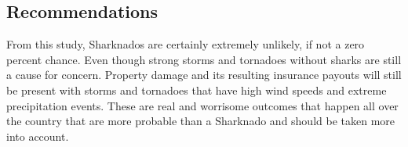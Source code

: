 \documentclass[
  letterpaper,
  DIV=11,
  numbers=noendperiod]{scrreprt}
\begin{document}
\subsection{Recommendations}\label{recommendations-1}

From this study, Sharknados are certainly extremely unlikely, if not a
zero percent chance. Even though strong storms and tornadoes without
sharks are still a cause for concern. Property damage and its resulting
insurance payouts will still be present with storms and tornadoes that
have high wind speeds and extreme precipitation events. These are real
and worrisome outcomes that happen all over the country that are more
probable than a Sharknado and should be taken more into account.
\end{document}

